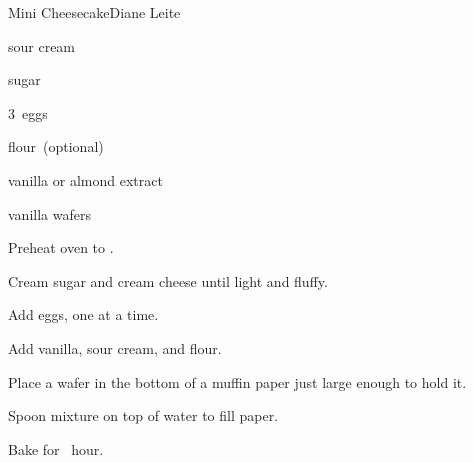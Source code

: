 \begin{recipe}{Mini Cheesecake}{Diane Leite}{}

\begin{ingredients}
\item {} 
\item {} sour cream
\item {} sugar
\item 3~eggs
\item {} flour~(optional)
\item {} vanilla or almond extract
\item vanilla wafers
\end{ingredients}

\begin{directions}
\item Preheat oven to .
\item Cream sugar and cream cheese until light and fluffy.
\item Add eggs, one at a time.
\item Add vanilla, sour cream, and flour.
\item Place a wafer in the bottom of a muffin paper just large enough to hold it.
\item Spoon mixture on top of water to fill paper.
\item Bake for \half~hour.
\end{directions}

\end{recipe}
